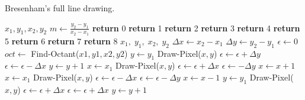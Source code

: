 \documentclass[a4paper]{article}
\begin{document}
\begin{algorithm}[H]
\caption{Bresenham's full line drawing.}
\label{alg:bres_pt2}
\begin{algorithmic}[1]
	 {$x_1,y_1,x_2,y_2$} 
	\State $m \leftarrow \frac{y_2-y_1}{x_2-x_1}$
		\State \textbf{return} 0 
		\State \textbf{return} 1 
		\State \textbf{return} 2
		\State \textbf{return} 3
		\State \textbf{return} 4
		\State \textbf{return} 5
		\State \textbf{return} 6
		\State \textbf{return} 7
	\Else {}
		\State \textbf{return} 8
	\EndIf
\EndProcedure
\State
{} {$x_1,\; y_1,\; x_2,\; y_2$} 
	\State $\Delta x \leftarrow x_2 - x_1$
	\State $\Delta y \leftarrow y_2 - y_1$
	\State $\epsilon \leftarrow 0$
	\State $oct \leftarrow$ Find-Octant($x1,y1,x2,y2$)
	 
		\State $y \leftarrow y_1$
			\State Draw-Pixel($x,y$)
			\State $\epsilon \leftarrow \epsilon + \Delta y$
				\State $\epsilon \leftarrow \epsilon - \Delta x$
				\State $y \leftarrow y + 1$
			\EndIf
		\EndFor
	 
		\State $x \leftarrow x_1$
			\State Draw-Pixel($x,y$)
			\State $\epsilon \leftarrow \epsilon + \Delta x$
				\State $\epsilon \leftarrow - \Delta y$
				\State $x \leftarrow x + 1$
			\EndIf
		\EndFor
	 
		\State $x \leftarrow x_1$
			\State Draw-Pixel($x,y$)
			\State $\epsilon \leftarrow \epsilon - \Delta x$
			\If { $2\epsilon \geq \Delta$}
				\State $\epsilon \leftarrow \epsilon - \Delta y$
				\State $x \leftarrow x - 1$
			\EndIf
		\EndFor
	  
		\State $y \leftarrow y_1$
			\State Draw-Pixel($x,y$)
			\State $\epsilon \leftarrow \epsilon + \Delta x$
				\State $\epsilon \leftarrow \epsilon + \Delta x$
				\State $y \leftarrow y + 1$
			\EndIf
		\EndFor
\EndProcedure
\end{algorithmic}
\end{algorithm}
\end{document}
